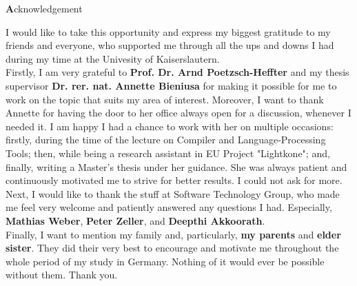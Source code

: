 
\begin{center}
{\Large \textbf Acknowledgement}
\end{center}
\vspace{1cm}

I would like to take this opportunity and express my biggest gratitude to my friends and everyone, who supported me through all the ups and downs I had during my time at the Univesity of Kaiserslautern. 
\\

Firstly, I am very grateful to \textbf{Prof. Dr. Arnd Poetzsch-Heffter} and my thesis supervisor \textbf{Dr. rer. nat. Annette Bieniusa} for making it possible for me to work on the topic that suits my area of interest. Moreover, I want to thank Annette for having the door to her office always open for a discussion, whenever I needed it. I am happy I had a chance to work with her on multiple occasions: firstly, during the time of the lecture on Compiler and Language-Processing Tools; then, while being a research assistant in EU Project "Lightkone"; and, finally, writing a Master's thesis under her guidance. She was always patient and continuously motivated me to strive for better results. I could not ask for more.
\\

Next, I would like to thank the stuff at Software Technology Group, who made me feel very welcome and patiently answered any questions I had. Especially, \textbf{Mathias Weber}, \textbf{Peter Zeller}, and \textbf{Deepthi Akkoorath}.
\\

Finally, I want to mention my family and, particularly, \textbf{my parents} and \textbf{elder sister}. They did their very best to encourage and motivate me throughout the whole period of my study in Germany. Nothing of it would ever be possible without them. Thank you.